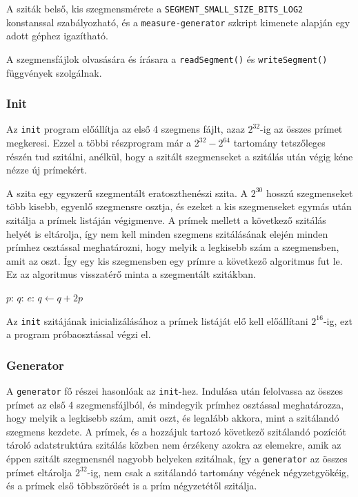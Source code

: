 A sziták belső, kis szegmensmérete a \texttt{SEGMENT\_SMALL\_SIZE\_BITS\_LOG2} konstanssal szabályozható, és a \texttt{measure-generator} szkript kimenete alapján egy adott géphez igazítható.

A szegmensfájlok olvasására és írásara a \texttt{readSegment()} és \texttt{writeSegment()} függvények szolgálnak.

\subsubsection{Init}

Az \texttt{init} program előállítja az első 4 szegmens fájlt, azaz $2^{32}$-ig az összes prímet megkeresi.
Ezzel a többi részprogram már a $2^{32} - 2^{64}$ tartomány tetszőleges részén tud szitálni, anélkül, hogy a szitált szegmenseket a szitálás után végig kéne nézze új prímekért.

A szita egy egyszerű szegmentált eratoszthenészi szita.
A $2^{30}$ hosszú szegmenseket több kisebb, egyenlő szegmensre osztja, és ezeket a kis szegmenseket
egymás után szitálja a prímek listáján végigmenve.
A prímek mellett a következő szitálás helyét is eltárolja, így nem kell minden szegmens szitálásának elején minden prímhez osztással meghatározni, hogy melyik a legkisebb szám a szegmensben, amit az oszt.
Így egy kis szegmensben egy prímre a következő algoritmus fut le.
Ez az algoritmus visszatérő minta a szegmentált szitákban.

\begin{algorithmic}[1]
\State $p$: 
\State $q$: 
\State $e$: 
	\State {}
	\State $q \gets q + 2p$
\EndWhile
\end{algorithmic}

Az \texttt{init} szitájának inicializálásához a prímek listáját elő kell előállítani $2^{16}$-ig, ezt a program próbaosztással végzi el.

\subsubsection{Generator}

A \texttt{generator} fő részei hasonlóak az \texttt{init}-hez.
Indulása után felolvassa az összes prímet az első 4 szegmensfájlból, és mindegyik prímhez osztással meghatározza, hogy melyik a legkisebb szám, amit oszt, és legalább akkora, mint a szitálandó szegmens kezdete.
A prímek, és a hozzájuk tartozó következő szitálandó pozíciót tároló adatstruktúra szitálás közben nem érzékeny azokra az elemekre, amik az éppen szitált szegmensnél nagyobb helyeken szitálnak, így a \texttt{generator} az összes prímet eltárolja $2^{32}$-ig, nem csak a szitálandó tartomány végének négyzetgyökéig, és a prímek első többszörösét is a prím négyzetétől szitálja.

